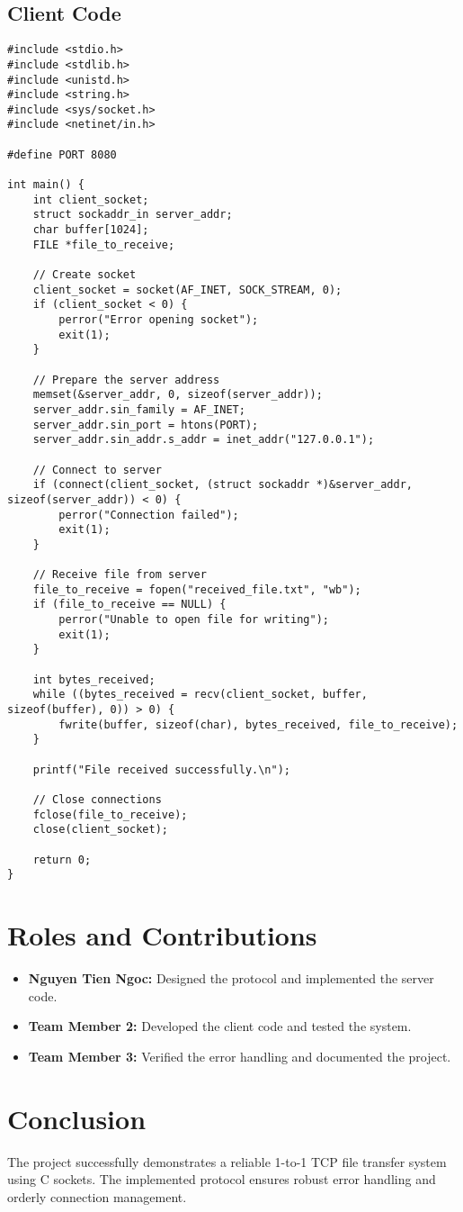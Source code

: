 \documentclass[a4paper,12pt]{article}
\begin{document}
\subsection*{Client Code}
\begin{verbatim}
#include <stdio.h>
#include <stdlib.h>
#include <unistd.h>
#include <string.h>
#include <sys/socket.h>
#include <netinet/in.h>

#define PORT 8080

int main() {
    int client_socket;
    struct sockaddr_in server_addr;
    char buffer[1024];
    FILE *file_to_receive;

    // Create socket
    client_socket = socket(AF_INET, SOCK_STREAM, 0);
    if (client_socket < 0) {
        perror("Error opening socket");
        exit(1);
    }

    // Prepare the server address
    memset(&server_addr, 0, sizeof(server_addr));
    server_addr.sin_family = AF_INET;
    server_addr.sin_port = htons(PORT);
    server_addr.sin_addr.s_addr = inet_addr("127.0.0.1");

    // Connect to server
    if (connect(client_socket, (struct sockaddr *)&server_addr, sizeof(server_addr)) < 0) {
        perror("Connection failed");
        exit(1);
    }

    // Receive file from server
    file_to_receive = fopen("received_file.txt", "wb");
    if (file_to_receive == NULL) {
        perror("Unable to open file for writing");
        exit(1);
    }

    int bytes_received;
    while ((bytes_received = recv(client_socket, buffer, sizeof(buffer), 0)) > 0) {
        fwrite(buffer, sizeof(char), bytes_received, file_to_receive);
    }

    printf("File received successfully.\n");

    // Close connections
    fclose(file_to_receive);
    close(client_socket);

    return 0;
}
\end{verbatim}

\section*{Roles and Contributions}
\begin{itemize}
    \item \textbf{Nguyen Tien Ngoc:} Designed the protocol and implemented the server code.
    \item \textbf{Team Member 2:} Developed the client code and tested the system.
    \item \textbf{Team Member 3:} Verified the error handling and documented the project.
\end{itemize}

\section*{Conclusion}
The project successfully demonstrates a reliable 1-to-1 TCP file transfer system using C sockets. The implemented protocol ensures robust error handling and orderly connection management.
\end{document}
